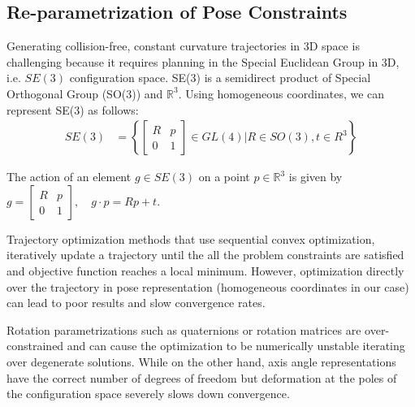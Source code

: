 \documentclass[0-suturing.tex]{subfiles}
\begin{document}
\subsection{\textbf{Re-parametrization of Pose Constraints}}
Generating collision-free, constant curvature trajectories in 3D space is challenging because it requires planning in the Special Euclidean Group in 3D, i.e. $SE(3)$ configuration space.
SE(3) is a semidirect product of Special Orthogonal Group (SO(3)) and $\mathbb{R}^3$. Using homogeneous coordinates, we can represent SE(3) as follows:
\begin{equation}
\begin{aligned}
SE(3) &= \left\{
\begin{bmatrix}
R & p \\
0 & 1
\end{bmatrix}
\in GL(4) \rvert R \in SO(3), t \in R^3 \right\}
\end{aligned}
\end{equation}

\noindent The action of an element $g \in SE(3)$ on a point $p \in \mathbb{R}^3$ is given by
$g = \begin{bmatrix}
R & p \\
0 & 1
\end{bmatrix},
\quad g \cdot p = Rp + t $.


Trajectory optimization methods that use sequential convex optimization, iteratively update a trajectory until the all the problem constraints are satisfied and objective function reaches a local minimum. However, optimization directly over the trajectory in pose representation (homogeneous coordinates in our case) can lead to poor results and slow convergence rates.

Rotation parametrizations such as quaternions or rotation matrices are over-constrained and can cause the optimization to be numerically unstable iterating over degenerate solutions.
While on the other hand, axis angle representations have the correct number of degrees of freedom but deformation at the poles of the configuration space severely slows down convergence.
\end{document}
